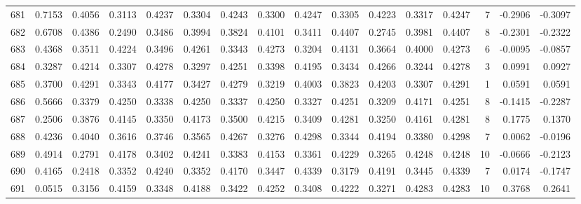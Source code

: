 \begin{tabular}{lrrrrrrrrrrrrrrr}
681 &      0.7153 &  0.4056 &  0.3113 &  0.4237 &  0.3304 &  0.4243 &  0.3300 &  0.4247 &  0.3305 &  0.4223 &   0.3317 &     0.4247 &      7 &                   -0.2906 &                    -0.3097 \\
682 &      0.6708 &  0.4386 &  0.2490 &  0.3486 &  0.3994 &  0.3824 &  0.4101 &  0.3411 &  0.4407 &  0.2745 &   0.3981 &     0.4407 &      8 &                   -0.2301 &                    -0.2322 \\
683 &      0.4368 &  0.3511 &  0.4224 &  0.3496 &  0.4261 &  0.3343 &  0.4273 &  0.3204 &  0.4131 &  0.3664 &   0.4000 &     0.4273 &      6 &                   -0.0095 &                    -0.0857 \\
684 &      0.3287 &  0.4214 &  0.3307 &  0.4278 &  0.3297 &  0.4251 &  0.3398 &  0.4195 &  0.3434 &  0.4266 &   0.3244 &     0.4278 &      3 &                    0.0991 &                     0.0927 \\
685 &      0.3700 &  0.4291 &  0.3343 &  0.4177 &  0.3427 &  0.4279 &  0.3219 &  0.4003 &  0.3823 &  0.4203 &   0.3307 &     0.4291 &      1 &                    0.0591 &                     0.0591 \\
686 &      0.5666 &  0.3379 &  0.4250 &  0.3338 &  0.4250 &  0.3337 &  0.4250 &  0.3327 &  0.4251 &  0.3209 &   0.4171 &     0.4251 &      8 &                   -0.1415 &                    -0.2287 \\
687 &      0.2506 &  0.3876 &  0.4145 &  0.3350 &  0.4173 &  0.3500 &  0.4215 &  0.3409 &  0.4281 &  0.3250 &   0.4161 &     0.4281 &      8 &                    0.1775 &                     0.1370 \\
688 &      0.4236 &  0.4040 &  0.3616 &  0.3746 &  0.3565 &  0.4267 &  0.3276 &  0.4298 &  0.3344 &  0.4194 &   0.3380 &     0.4298 &      7 &                    0.0062 &                    -0.0196 \\
689 &      0.4914 &  0.2791 &  0.4178 &  0.3402 &  0.4241 &  0.3383 &  0.4153 &  0.3361 &  0.4229 &  0.3265 &   0.4248 &     0.4248 &     10 &                   -0.0666 &                    -0.2123 \\
690 &      0.4165 &  0.2418 &  0.3352 &  0.4240 &  0.3352 &  0.4170 &  0.3447 &  0.4339 &  0.3179 &  0.4191 &   0.3445 &     0.4339 &      7 &                    0.0174 &                    -0.1747 \\
691 &      0.0515 &  0.3156 &  0.4159 &  0.3348 &  0.4188 &  0.3422 &  0.4252 &  0.3408 &  0.4222 &  0.3271 &   0.4283 &     0.4283 &     10 &                    0.3768 &                     0.2641 \\

\end{tabular}

